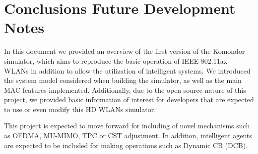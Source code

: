 \documentclass[a4paper]{article}
\begin{document}
\section{Conclusions Future Development Notes}
\label{section:conclusions}

In this document we provided an overview of the first version of the Komondor simulator, which aims to reproduce the basic operation of IEEE 802.11ax WLANs in addition to allow the utilization of intelligent systems. We introduced the system model considered when building the simulator, as well as the main MAC features implemented. Additionally, due to the open source nature of this project, we provided basic information of interest for developers that are expected to use or even modify this HD WLANs simulator.

This project is expected to move forward for including of novel mechanisms such as OFDMA, MU-MIMO, TPC or  CST adjustment. In addition, intelligent agents are expected to be included for making operations such as Dynamic CB (DCB).



\end{document}
